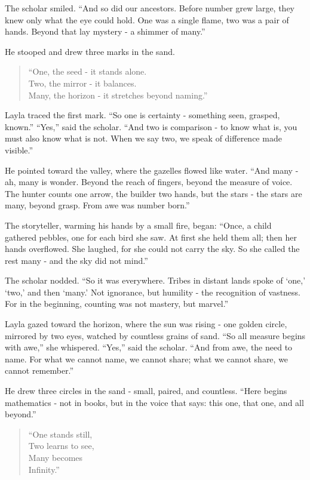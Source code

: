 \documentclass[
  letterpaper,
  DIV=11,
  numbers=noendperiod]{scrreprt}
\begin{document}
The scholar smiled. ``And so did our ancestors. Before number grew
large, they knew only what the eye could hold. One was a single flame,
two was a pair of hands. Beyond that lay mystery - a shimmer of many.''

He stooped and drew three marks in the sand.

\begin{quote}
``One, the seed - it stands alone.\\
Two, the mirror - it balances.\\
Many, the horizon - it stretches beyond naming.''
\end{quote}

Layla traced the first mark. ``So one is certainty - something seen,
grasped, known.'' ``Yes,'' said the scholar. ``And two is comparison -
to know what is, you must also know what is not. When we say two, we
speak of difference made visible.''

He pointed toward the valley, where the gazelles flowed like water.
``And many - ah, many is wonder. Beyond the reach of fingers, beyond the
measure of voice. The hunter counts one arrow, the builder two hands,
but the stars - the stars are many, beyond grasp. From awe was number
born.''

The storyteller, warming his hands by a small fire, began: ``Once, a
child gathered pebbles, one for each bird she saw. At first she held
them all; then her hands overflowed. She laughed, for she could not
carry the sky. So she called the rest many - and the sky did not mind.''

The scholar nodded. ``So it was everywhere. Tribes in distant lands
spoke of `one,' `two,' and then `many.' Not ignorance, but humility -
the recognition of vastness. For in the beginning, counting was not
mastery, but marvel.''

Layla gazed toward the horizon, where the sun was rising - one golden
circle, mirrored by two eyes, watched by countless grains of sand. ``So
all measure begins with awe,'' she whispered. ``Yes,'' said the scholar.
``And from awe, the need to name. For what we cannot name, we cannot
share; what we cannot share, we cannot remember.''

He drew three circles in the sand - small, paired, and countless. ``Here
begins mathematics - not in books, but in the voice that says: this one,
that one, and all beyond.''

\begin{quote}
``One stands still,\\
Two learns to see,\\
Many becomes\\
Infinity.''
\end{quote}
\end{document}
